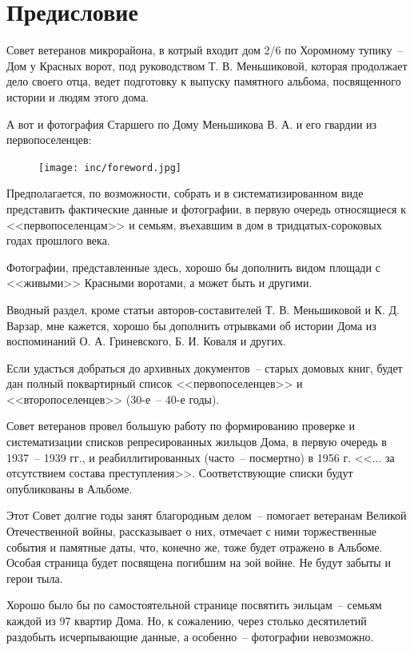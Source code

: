 \chapter{Предисловие}

Совет ветеранов микрорайона, в котрый входит дом 2/6 по Хоромному тупику~-- Дом у Красных ворот, под руководством Т. В. Меньшиковой, которая продолжает дело своего отца, ведет подготовку к выпуску памятного альбома, посвященного истории и людям этого дома.

А вот и фотография Старшего по Дому Меньшикова В. А. и его гвардии из первопоселенцев:

\begin{figure}[ht]
  \centering
  \texttt{[image: inc/foreword.jpg]}
\end{figure}

Предполагается, по возможности, собрать и в систематизированном виде представить фактические данные и фотографии, в первую очередь относящиеся к <<первопоселенцам>> и семьям, въехавшим в дом в тридцатых-сороковых годах прошлого века.

Фотографии, представленные здесь, хорошо бы дополнить видом площади с <<живыми>> Красными воротами, а может быть и другими.

Вводный раздел, кроме статьи авторов-составителей Т. В. Меньшиковой и К. Д. Варзар, мне кажется, хорошо бы дополнить отрывками об истории Дома из воспоминаний О. А. Гриневского, Б. И. Коваля и других.

Если удасться добраться до архивных документов~-- старых домовых книг, будет дан полный поквартирный список <<первопоселенцев>> и <<второпоселенцев>> (30-е~-- 40-е годы).

Совет ветеранов провел большую работу по формированию проверке и систематизации списков репресированных жильцов Дома, в первую очередь в 1937~-- 1939 гг., и реабиллитированных (часто~-- посмертно) в 1956 г. <<... за отсутствием состава преступления>>. Соответствующие списки будут опубликованы в Альбоме.

Этот Совет долгие годы занят благородным делом~-- помогает ветеранам Великой Отечественной войны, рассказывает о них, отмечает с ними торжественные события и памятные даты, что, конечно же, тоже будет отражено в Альбоме. Особая страница будет посвящена погибшим на эой войне. Не будут забыты и герои тыла.

Хорошо было бы по самостоятельной странице посвятить эильцам~-- семьям каждой из 97 квартир Дома. Но, к сожалению, через столько десятилетий раздобыть исчерпывающие данные, а особенно~-- фотографии невозможно.

